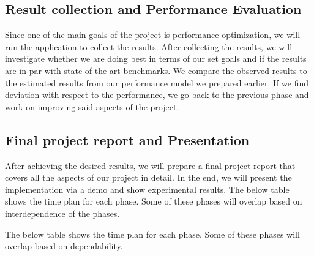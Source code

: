 \documentclass[titlepage]{report}
\begin{document}
\subsection{Result collection and Performance Evaluation}
Since one of the main goals of the project is performance optimization, we will run the application to collect the results. After collecting the results, we will investigate whether we are doing best in terms of our set goals and if the results are in par with state-of-the-art benchmarks. We compare the observed results to the estimated results from our performance model we prepared earlier. If we find deviation with respect to the performance, we go back to the previous phase and work on improving said aspects of the project.

\subsection{Final project report and Presentation}
After achieving the desired results, we will prepare a final project report that covers all the aspects of our project in detail. In the end, we will present the implementation via a demo and show experimental results. The below table shows the time plan for each phase. Some of these phases will overlap based on interdependence of the phases. 

The below table shows the time plan for each phase. Some of these phases will overlap based on dependability.
\end{document}
